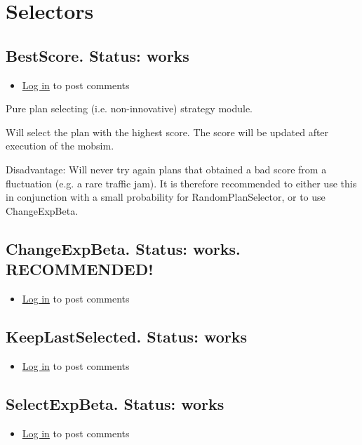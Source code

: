 \documentclass[a4paper,11pt]{report}
\begin{document}
\section{Selectors}

\subsection{BestScore.  Status: works}
\begin{itemize}
	\item \href{http://www.matsim.org/user/login?destination=comment/reply/698%23comment-form}{Log in} to post comments
\end{itemize}

Pure plan selecting (i.e. non-innovative) strategy module.

Will select the plan with the highest score. The score will be updated after execution of the mobsim.

Disadvantage: Will never try again plans that obtained a bad score  from a fluctuation (e.g. a rare traffic jam). It is therefore  recommended to either use this in conjunction with a small probability  for RandomPlanSelector, or to use ChangeExpBeta.

\subsection{ChangeExpBeta. Status: works. RECOMMENDED!}
\begin{itemize}
	\item \href{http://www.matsim.org/user/login?destination=comment/reply/700%23comment-form}{Log in} to post comments
\end{itemize}

\subsection{KeepLastSelected. Status: works}
\begin{itemize}
	\item \href{http://www.matsim.org/user/login?destination=comment/reply/702%23comment-form}{Log in} to post comments
\end{itemize}

\subsection{SelectExpBeta. Status: works}
\begin{itemize}
	\item \href{http://www.matsim.org/user/login?destination=comment/reply/699%23comment-form}{Log in} to post comments
\end{itemize}
\end{document}
